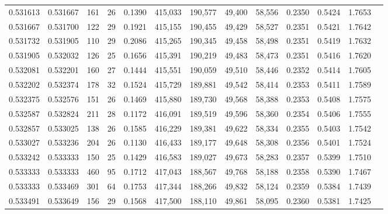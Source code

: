 \begin{tabular}{rrrrrrrrrrrrr}
0.531613 & 0.531667 &    161 &    26 &                                     0.1390 & 415,033 & 190,577 &  49,400 &  58,556 & 0.2350 & 0.5424 & 1.7653 \\
0.531667 & 0.531700 &    122 &    29 &                                     0.1921 & 415,155 & 190,455 &  49,429 &  58,527 & 0.2351 & 0.5421 & 1.7642 \\
0.531732 & 0.531905 &    110 &    29 &                                     0.2086 & 415,265 & 190,345 &  49,458 &  58,498 & 0.2351 & 0.5419 & 1.7632 \\
0.531905 & 0.532032 &    126 &    25 &                                     0.1656 & 415,391 & 190,219 &  49,483 &  58,473 & 0.2351 & 0.5416 & 1.7620 \\
0.532081 & 0.532201 &    160 &    27 &                                     0.1444 & 415,551 & 190,059 &  49,510 &  58,446 & 0.2352 & 0.5414 & 1.7605 \\
0.532202 & 0.532374 &    178 &    32 &                                     0.1524 & 415,729 & 189,881 &  49,542 &  58,414 & 0.2353 & 0.5411 & 1.7589 \\
0.532375 & 0.532576 &    151 &    26 &                                     0.1469 & 415,880 & 189,730 &  49,568 &  58,388 & 0.2353 & 0.5408 & 1.7575 \\
0.532587 & 0.532824 &    211 &    28 &                                     0.1172 & 416,091 & 189,519 &  49,596 &  58,360 & 0.2354 & 0.5406 & 1.7555 \\
0.532857 & 0.533025 &    138 &    26 &                                     0.1585 & 416,229 & 189,381 &  49,622 &  58,334 & 0.2355 & 0.5403 & 1.7542 \\
0.533027 & 0.533236 &    204 &    26 &                                     0.1130 & 416,433 & 189,177 &  49,648 &  58,308 & 0.2356 & 0.5401 & 1.7524 \\
0.533242 & 0.533333 &    150 &    25 &                                     0.1429 & 416,583 & 189,027 &  49,673 &  58,283 & 0.2357 & 0.5399 & 1.7510 \\
0.533333 & 0.533333 &    460 &    95 &                                     0.1712 & 417,043 & 188,567 &  49,768 &  58,188 & 0.2358 & 0.5390 & 1.7467 \\
0.533333 & 0.533469 &    301 &    64 &                                     0.1753 & 417,344 & 188,266 &  49,832 &  58,124 & 0.2359 & 0.5384 & 1.7439 \\
0.533491 & 0.533649 &    156 &    29 &                                     0.1568 & 417,500 & 188,110 &  49,861 &  58,095 & 0.2360 & 0.5381 & 1.7425 \\

\end{tabular}
